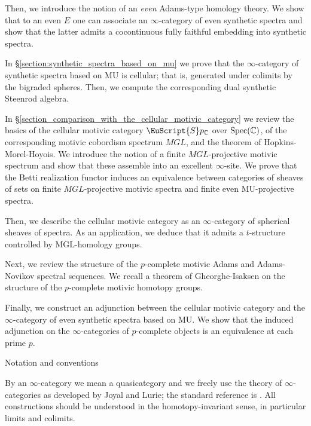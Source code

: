 \documentclass[oneside,a4paper]{amsart}
\makeatletter
\newcommand{\euscr}[1]{\EuScript{#1}} %
\newcommand{\MU}{\mathrm{MU}} %
\newcommand{\MGL}{\mathrm{MGL}} %
\newcommand{\cspectra}{\euscr{S}p_{\mathbb{C}}} %
\theoremstyle{plain}
\theoremstyle{definition}
\theoremstyle{remark}
\def\subsection{\@startsection{subsection}{1}%
  \z@{.7\linespacing\@plus\linespacing}{.5\linespacing}%
  {\normalfont\bfseries\centering}}%
\makeatother
\begin{document}
Then, we introduce the notion of an \emph{even} Adams-type homology theory. We show that to an even $E$ one can associate an $\infty$-category of even synthetic spectra and show that the latter admits a cocontinuous fully faithful embedding into synthetic spectra. 

In \S\ref{section:synthetic_spectra_based_on_mu} we prove that the $\infty$-category of synthetic spectra based on $\MU$ is cellular; that is, generated under colimits by the bigraded spheres. Then, we compute the corresponding dual synthetic Steenrod algebra.

In \S\ref{section_comparison_with_the_cellular_motivic_category} we review the basics of the cellular motivic category $\cspectra$ over $\textnormal{Spec}(\mathbb{C})$, of the corresponding motivic cobordism spectrum $MGL$, and the theorem of Hopkins-Morel-Hoyois. We introduce the notion of a finite $MGL$-projective motivic spectrum and show that these assemble into an excellent $\infty$-site. We prove that the Betti realization functor induces an equivalence between categories of sheaves of sets on finite $MGL$-projective motivic spectra and finite even $\MU$-projective spectra. 

Then, we describe the cellular motivic category as an $\infty$-category of spherical sheaves of spectra. As an application, we deduce that it admits a $t$-structure controlled by $\MGL$-homology groups. 

Next, we review the structure of the $p$-complete motivic Adams and Adams-Novikov spectral sequences. We recall a theorem of Gheorghe-Isaksen on the structure of the $p$-complete motivic homotopy groups. 

Finally, we construct an adjunction between the cellular motivic category and the $\infty$-category of even synthetic spectra based on $\MU$. We show that the induced adjunction on the $\infty$-categories of $p$-complete objects is an equivalence at each prime $p$. 

\subsection{Notation and conventions}

By an $\infty$-category we mean a quasicategory and we freely use the theory of $\infty$-categories as developed by Joyal and Lurie; the standard reference is \cite{lurie_higher_topos_theory}. All constructions should be understood in the homotopy-invariant sense, in particular limits and colimits. 
\end{document}
